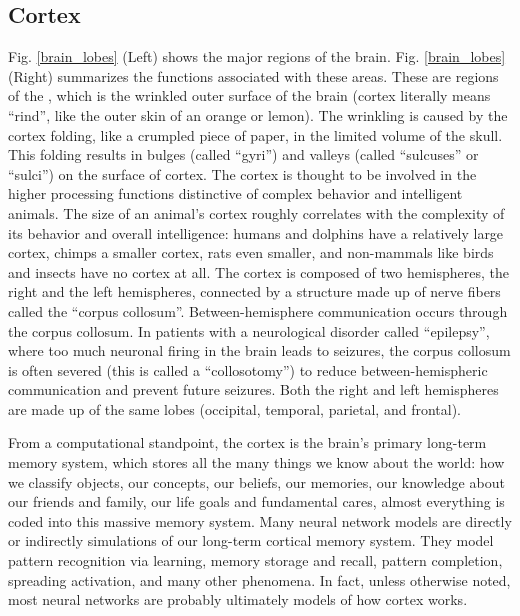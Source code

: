 \subsection{Cortex}

Fig. \ref{brain_lobes} (Left) shows the major regions of the brain. Fig. \ref{brain_lobes} (Right) summarizes the functions associated with these areas. These are regions of the , which is the wrinkled outer surface of the brain (cortex literally means ``rind'', like the outer skin of an orange or lemon). The wrinkling is caused by the cortex folding, like a crumpled piece of paper, in the limited volume of the skull. This folding results in bulges (called ``gyri'') and valleys (called  ``sulcuses'' or ``sulci'') on the surface of cortex. The cortex is thought to be involved in the higher processing functions distinctive of complex behavior and intelligent animals. The size of an animal's cortex roughly correlates with the complexity of its behavior and overall intelligence: humans and dolphins have a relatively large cortex, chimps a smaller cortex, rats even smaller, and non-mammals like birds and insects have no cortex at all. The cortex is composed of two hemispheres, the right and the left hemispheres, connected by a structure made up of nerve fibers called the ``corpus collosum''. Between-hemisphere communication occurs through the corpus collosum. In patients with a neurological disorder called ``epilepsy'', where too much neuronal firing in the brain leads to seizures, the corpus collosum is often severed (this is called a ``collosotomy'') to reduce between-hemispheric communication and prevent future seizures. Both the right and left hemispheres are made up of the same lobes (occipital, temporal, parietal, and frontal).	

From a computational standpoint, the cortex is the brain's primary long-term memory system, which stores all the many things we know about the world: how we classify objects, our concepts, our beliefs, our memories, our knowledge about our friends and family, our life goals and fundamental cares, almost everything is coded into this massive memory system. Many neural network models are directly or indirectly simulations of our long-term cortical memory system. They model pattern recognition via learning, memory storage and recall, pattern completion, spreading activation, and many other phenomena. In fact, unless otherwise noted, most neural networks are probably ultimately models of how cortex works.

